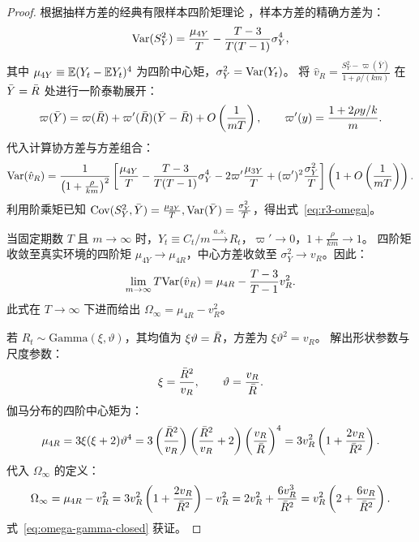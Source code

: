 \begin{proof}
根据抽样方差的经典有限样本四阶矩理论 \citep{casella2002statistical}，样本方差的精确方差为：
\begin{equation}
  \mathrm{Var}(S_Y^2) = \frac{\mu_{4Y}}{T} - \frac{T - 3}{T(T - 1)} \sigma_Y^4,
\end{equation}
其中 $\mu_{4Y} \equiv \mathbb{E}(Y_t - \mathbb{E} Y_t)^4$ 为四阶中心矩，$\sigma_Y^2 = \mathrm{Var}(Y_t)$。
将 $\hat{v}_R = \frac{S_Y^2 - \varpi(\bar{Y})}{1 + \rho/(km)}$ 在 $\bar{Y} = \bar{R}$ 处进行一阶泰勒展开：
\begin{equation}
  \varpi(\bar{Y}) = \varpi(\bar{R}) + \varpi'(\bar{R})(\bar{Y} - \bar{R}) + O\left(\frac{1}{mT}\right), \qquad \varpi'(y) = \frac{1 + 2\rho y/k}{m}.
\end{equation}
代入计算协方差与方差组合：
\begin{equation}
  \mathrm{Var}(\hat{v}_R) = \frac{1}{\left(1 + \frac{\rho}{km}\right)^2} \left[ \frac{\mu_{4Y}}{T} - \frac{T - 3}{T(T - 1)} \sigma_Y^4 - 2\varpi'\frac{\mu_{3Y}}{T} + (\varpi')^2 \frac{\sigma_Y^2}{T} \right] \left(1 + O\left(\frac{1}{mT}\right)\right).
  \label{eq:r3-omega}
\end{equation}
利用阶乘矩已知 $\mathrm{Cov}(S_Y^2, \bar{Y}) = \frac{\mu_{3Y}}{T}, \mathrm{Var}(\bar{Y}) = \frac{\sigma_Y^2}{T}$，得出式~\eqref{eq:r3-omega}。

当固定期数 $T$ 且 $m \to \infty$ 时，$Y_t \equiv C_t/m \xrightarrow{a.s.} R_t$，$\varpi' \to 0$，$1 + \frac{\rho}{km} \to 1$。
四阶矩收敛至真实环境的四阶矩 $\mu_{4Y} \to \mu_{4R}$，中心方差收敛至 $\sigma_Y^2 \to v_R$。因此：
\begin{equation}
  \lim_{m \to \infty} T \mathrm{Var}(\hat{v}_R) = \mu_{4R} - \frac{T-3}{T-1} v_R^2.
\end{equation}
此式在 $T \to \infty$ 下进而给出 $\Omega_\infty = \mu_{4R} - v_R^2$。

若 $R_t \sim \text{Gamma}(\xi, \vartheta)$，其均值为 $\xi\vartheta = \bar{R}$，方差为 $\xi\vartheta^2 = v_R$。
解出形状参数与尺度参数：
\begin{equation}
  \xi = \frac{\bar{R}^2}{v_R}, \qquad \vartheta = \frac{v_R}{\bar{R}}.
\end{equation}
伽马分布的四阶中心矩为：
\begin{equation}
  \mu_{4R} = 3\xi(\xi + 2)\vartheta^4 = 3\left( \frac{\bar{R}^2}{v_R} \right)\left( \frac{\bar{R}^2}{v_R} + 2 \right)\left( \frac{v_R}{\bar{R}} \right)^4 = 3 v_R^2 \left( 1 + \frac{2 v_R}{\bar{R}^2} \right).
\end{equation}
代入 $\Omega_\infty$ 的定义：
\begin{equation}
  \Omega_\infty = \mu_{4R} - v_R^2 = 3 v_R^2 \left( 1 + \frac{2 v_R}{\bar{R}^2} \right) - v_R^2 = 2 v_R^2 + \frac{6 v_R^3}{\bar{R}^2} = v_R^2 \left( 2 + \frac{6 v_R}{\bar{R}^2} \right).
\end{equation}
式~\eqref{eq:omega-gamma-closed} 获证。
\end{proof}

